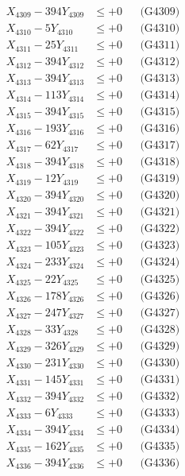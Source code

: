 \documentclass[a4paper,10pt]{article}
\begin{document}
{\begin{align}
X_{4309} - 394Y_{4309} &\leq +0 && \text{(G4309)} \\
X_{4310} - 5Y_{4310} &\leq +0 && \text{(G4310)} \\
\allowbreak
X_{4311} - 25Y_{4311} &\leq +0 && \text{(G4311)} \\
X_{4312} - 394Y_{4312} &\leq +0 && \text{(G4312)} \\
X_{4313} - 394Y_{4313} &\leq +0 && \text{(G4313)} \\
X_{4314} - 113Y_{4314} &\leq +0 && \text{(G4314)} \\
X_{4315} - 394Y_{4315} &\leq +0 && \text{(G4315)} \\
X_{4316} - 193Y_{4316} &\leq +0 && \text{(G4316)} \\
X_{4317} - 62Y_{4317} &\leq +0 && \text{(G4317)} \\
X_{4318} - 394Y_{4318} &\leq +0 && \text{(G4318)} \\
X_{4319} - 12Y_{4319} &\leq +0 && \text{(G4319)} \\
X_{4320} - 394Y_{4320} &\leq +0 && \text{(G4320)} \\
\allowbreak
X_{4321} - 394Y_{4321} &\leq +0 && \text{(G4321)} \\
X_{4322} - 394Y_{4322} &\leq +0 && \text{(G4322)} \\
X_{4323} - 105Y_{4323} &\leq +0 && \text{(G4323)} \\
X_{4324} - 233Y_{4324} &\leq +0 && \text{(G4324)} \\
X_{4325} - 22Y_{4325} &\leq +0 && \text{(G4325)} \\
X_{4326} - 178Y_{4326} &\leq +0 && \text{(G4326)} \\
X_{4327} - 247Y_{4327} &\leq +0 && \text{(G4327)} \\
X_{4328} - 33Y_{4328} &\leq +0 && \text{(G4328)} \\
X_{4329} - 326Y_{4329} &\leq +0 && \text{(G4329)} \\
X_{4330} - 231Y_{4330} &\leq +0 && \text{(G4330)} \\
\allowbreak
X_{4331} - 145Y_{4331} &\leq +0 && \text{(G4331)} \\
X_{4332} - 394Y_{4332} &\leq +0 && \text{(G4332)} \\
X_{4333} - 6Y_{4333} &\leq +0 && \text{(G4333)} \\
X_{4334} - 394Y_{4334} &\leq +0 && \text{(G4334)} \\
X_{4335} - 162Y_{4335} &\leq +0 && \text{(G4335)} \\
X_{4336} - 394Y_{4336} &\leq +0 && \text{(G4336)} \\

\end{align}}
\end{document}
